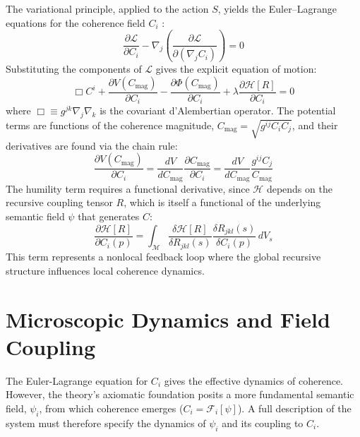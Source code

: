 The variational principle, applied to the action \(S\), yields the Euler–Lagrange equations for the coherence field \(C_i\) \autocite{Euler1744, Lagrange1788}:
\begin{equation}
\frac{\partial \mathcal{L}}{\partial C_i} - \nabla_j \left( \frac{\partial \mathcal{L}}{\partial (\nabla_j C_i)} \right) = 0
\end{equation}
Substituting the components of \(\mathcal{L}\) gives the explicit equation of motion:
\begin{equation}
\Box C^i + \frac{\partial V(C_{\mathrm{mag}})}{\partial C_i} - \frac{\partial \Phi(C_{\mathrm{mag}})}{\partial C_i} + \lambda \frac{\partial \mathcal{H}[R]}{\partial C_i} = 0
\end{equation}
where \(\Box \equiv g^{jk}\nabla_j \nabla_k\) is the covariant d'Alembertian operator. The potential terms are functions of the coherence magnitude, \(C_{\text{mag}} = \sqrt{g^{ij} C_i C_j}\), and their derivatives are found via the chain rule:
\begin{equation}
\frac{\partial V(C_{\mathrm{mag}})}{\partial C_i} = \frac{dV}{dC_{\mathrm{mag}}} \frac{\partial C_{\mathrm{mag}}}{\partial C_i} = \frac{dV}{dC_{\mathrm{mag}}} \frac{g^{ij} C_j}{C_{\mathrm{mag}}}
\end{equation}
The humility term requires a functional derivative, since \(\mathcal{H}\) depends on the recursive coupling tensor \(R\), which is itself a functional of the underlying semantic field \(\psi\) that generates \(C\):
\begin{equation}
\frac{\partial \mathcal{H}[R]}{\partial C_i(p)} = \int_{\mathcal{M}} \frac{\delta \mathcal{H}[R]}{\delta R_{jkl}(s)} \frac{\delta R_{jkl}(s)}{\delta C_i(p)} \, dV_s
\end{equation}
This term represents a nonlocal feedback loop where the global recursive structure influences local coherence dynamics.

\section{Microscopic Dynamics and Field Coupling}

The Euler-Lagrange equation for \(C_i\) gives the effective dynamics of coherence. However, the theory's axiomatic foundation posits a more fundamental semantic field, \(\psi_i\), from which coherence emerges (\(C_i = \mathcal{F}_i[\psi]\)). A full description of the system must therefore specify the dynamics of \(\psi_i\) and its coupling to \(C_i\).

